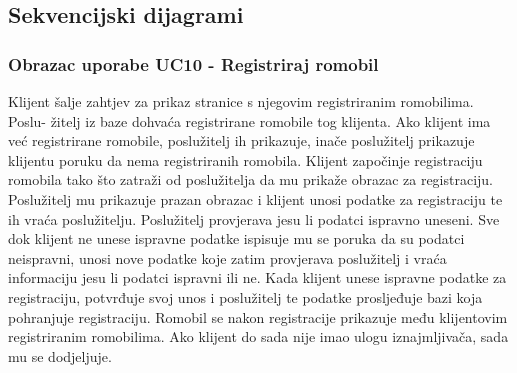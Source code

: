 					
					
				\eject		
				
			\subsection{Sekvencijski dijagrami}

				\subsubsection{Obrazac uporabe UC10 - Registriraj romobil}
						Klijent šalje zahtjev za prikaz stranice s njegovim registriranim romobilima. Poslu- žitelj iz baze dohvaća registrirane romobile tog klijenta. Ako klijent ima već registrirane romobile, poslužitelj ih prikazuje, inače poslužitelj prikazuje klijentu poruku da nema registriranih romobila. Klijent započinje registraciju romobila tako što zatraži od poslužitelja da mu prikaže obrazac za registraciju. Poslužitelj mu prikazuje prazan obrazac i klijent unosi podatke za registraciju te ih vraća poslužitelju. Poslužitelj provjerava jesu li podatci ispravno uneseni. Sve dok klijent ne unese ispravne podatke ispisuje mu se poruka da su podatci neispravni, unosi nove podatke koje zatim provjerava poslužitelj i vraća informaciju jesu li podatci ispravni ili ne. Kada klijent unese ispravne podatke za registraciju, potvrđuje svoj unos i poslužitelj te podatke prosljeđuje bazi koja pohranjuje registraciju. Romobil se nakon registracije prikazuje među klijentovim registriranim romobilima. Ako klijent do sada nije imao ulogu iznajmljivača, sada mu se dodjeljuje. 
						
